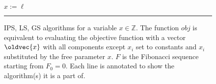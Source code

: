 \documentclass{llncs}
\let\vec\oldvec %
\newcommand{\ips}{IPS}
\newcommand{\gs}{GS}
\newcommand{\ls}{LS}
\newcommand{\AppliesAll}{\Comment{$\{\textrm{\ips}, \textrm{\gs}, \textrm{\ls}\}$}}
\newcommand{\AppliesIPS}{\Comment{$\{\textrm{\ips}\}$}}
\newcommand{\AppliesGS}{\Comment{$\{\textrm{\gs}\}$}}
\newcommand{\AppliesLS}{\Comment{$\{\textrm{\ls}\}$}}
\newcommand{\AppliesGSLS}{\Comment{$\{\textrm{\gs}, \textrm{\ls}\}$}}
\newcommand{\pagerule}{\noindent \rule{\textwidth}{.5pt}}
\begin{document}
\begin{figure}[t!]
\begin{algorithmic}[1]
    \State$x:=\ell$ \AppliesGSLS
\end{algorithmic}
%
%
%
%
%
\vspace{-1em}
\pagerule
\vspace{-1em}


\caption{\label{fig:alg}IPS, LS, GS algorithms for a variable $x \in \mathbb{Z}$. The function $obj$ is equivalent to evaluating the objective function with a vector $\vec{x}$ with all components except $x_i$ set to constants and $x_i$ substituted by the free parameter $x$. $F$ is the Fibonacci sequence starting from $F_0=0$. Each line is annotated to show the algorithm(s) it is a part of.}
\vspace{-1em}
\end{figure}
\end{document}
